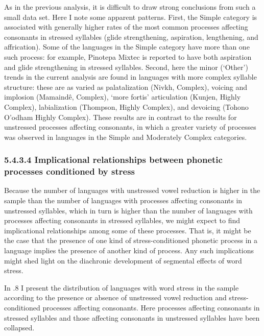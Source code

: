   As in the previous analysis, it is difficult to draw strong conclusions from such a small data set. Here I note some apparent patterns. First, the Simple category is associated with generally higher rates of the most common processes affecting consonants in stressed syllables (glide strengthening, aspiration, lengthening, and affrication). Some of the languages in the Simple category have more than one such process: for example, Pinotepa Mixtec is reported to have both aspiration and glide strengthening in stressed syllables. Second, here the minor (‘Other’) trends in the current analysis are found in languages with more complex syllable structure: these are as varied as palatalization (Nivkh, Complex), voicing and implosion (Mamaindê, Complex), ‘more fortis’ articulation (Kunjen, Highly Complex), labialization (Thompson, Highly Complex), and devoicing (Tohono O’odham Highly Complex). These results are in contrast to the results for unstressed processes affecting consonants, in which a greater variety of processes was observed in languages in the Simple and Moderately Complex categories.

\subsubsection{\textbf{5.4.3.4} \textbf{Implicational} \textbf{relationships} \textbf{between} \textbf{phonetic} \textbf{processes} \textbf{conditioned} \textbf{by} \textbf{stress}}

  Because the number of languages with unstressed vowel reduction is higher in the sample than the number of languages with processes affecting consonants in unstressed syllables, which in turn is higher than the number of languages with processes affecting consonants in stressed syllables, we might expect to find implicational relationships among some of these processes. That is, it might be the case that the presence of one kind of stress-conditioned phonetic process in a language implies the presence of another kind of process. Any such implications might shed light on the diachronic development of segmental effects of word stress.

  In .8 I present the distribution of languages with word stress in the sample according to the presence or absence of unstressed vowel reduction and stress-conditioned processes affecting consonants. Here processes affecting consonants in stressed syllables and those affecting consonants in unstressed syllables have been collapsed.

